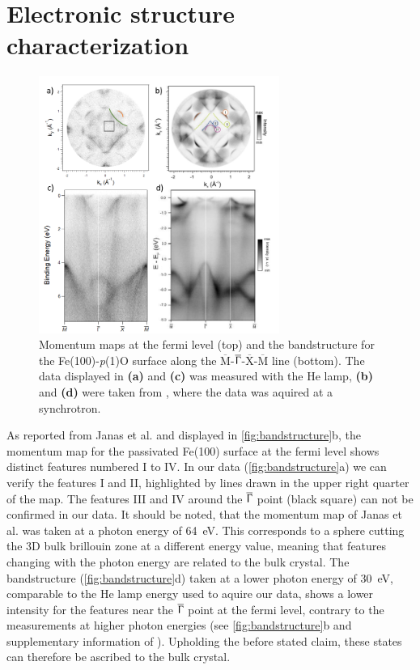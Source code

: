 \newpage
\section{Electronic structure characterization}
\begin{figure}[h]
    \centering
    \includegraphics[width = 0.7\textwidth]{Plots/bandstructure.png}
    \caption{Momentum maps at the fermi level (top) and the bandstructure for the Fe(100)-\textit{p}(1)O surface along the $\overline{\text{M}}$-$\overline{\Upgamma}$-$\overline{\text{X}}$-$\overline{\text{M}}$ line (bottom). The data displayed in \textbf{(a)} and \textbf{(c)} was measured with the He lamp, \textbf{(b)} and \textbf{(d)} were taken from \cite*{janas_enhancing_2022}, where the data was aquired at a synchrotron.}
    \label{fig:bandstructure}
\end{figure}
\FloatBarrier

As reported from Janas et al. \cite*{janas_enhancing_2022} and displayed in \autoref{fig:bandstructure}b, the momentum map for the passivated Fe(100) surface at the fermi level shows distinct features numbered I to IV.
In our data (\autoref{fig:bandstructure}a) we can verify the features I and II, highlighted by lines drawn in the upper right quarter of the map.
The features III and IV around the $\overline{\Upgamma}$ point (black square) can not be confirmed in our data.
It should be noted, that the momentum map of Janas et al. \cite*{janas_enhancing_2022} was taken at a photon energy of \qty{64}{eV}.
This corresponds to a sphere cutting the 3D bulk brillouin zone at a different energy value, meaning that features changing 
with the photon energy are related to the bulk crystal.
The bandstructure (\autoref{fig:bandstructure}d) taken at a lower photon energy of \qty{30}{eV}, comparable to the He lamp energy used to aquire our data, shows a lower intensity for the features near the $\overline{\Upgamma}$ point at the fermi level,
contrary to the measurements at higher photon energies (see \autoref{fig:bandstructure}b and supplementary information of \cite*{janas_enhancing_2022}). 
Upholding the before stated claim, these states can therefore be ascribed to the bulk crystal.

